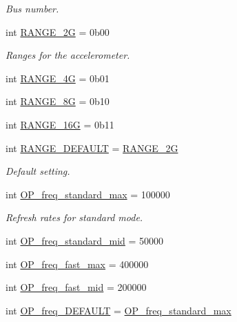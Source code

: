 \begin{DoxyCompactItemize}
\begin{DoxyCompactList}\small\item\em Bus number. \end{DoxyCompactList}\item 
int \mbox{\hyperlink{classlis3dh_1_1_l_i_s3_d_h_acb2659f4fa975b428d057cbdc2cc3994}{R\+A\+N\+G\+E\+\_\+2G}} = 0b00
\begin{DoxyCompactList}\small\item\em Ranges for the accelerometer. \end{DoxyCompactList}\item 
int \mbox{\hyperlink{classlis3dh_1_1_l_i_s3_d_h_a97209e265eb6f014b3bbd76f5effead4}{R\+A\+N\+G\+E\+\_\+4G}} = 0b01
\item 
int \mbox{\hyperlink{classlis3dh_1_1_l_i_s3_d_h_a8d7fe1d3e9ac748e51a60c88f6b9919c}{R\+A\+N\+G\+E\+\_\+8G}} = 0b10
\item 
int \mbox{\hyperlink{classlis3dh_1_1_l_i_s3_d_h_a6b8e3da0d38d864ad38d06a9bf413531}{R\+A\+N\+G\+E\+\_\+16G}} = 0b11
\item 
int \mbox{\hyperlink{classlis3dh_1_1_l_i_s3_d_h_a022306eeafee6751efac48439f7d1ef1}{R\+A\+N\+G\+E\+\_\+\+D\+E\+F\+A\+U\+LT}} = \mbox{\hyperlink{classlis3dh_1_1_l_i_s3_d_h_acb2659f4fa975b428d057cbdc2cc3994}{R\+A\+N\+G\+E\+\_\+2G}}
\begin{DoxyCompactList}\small\item\em Default setting. \end{DoxyCompactList}\item 
int \mbox{\hyperlink{classlis3dh_1_1_l_i_s3_d_h_a1668b09c1c200ebe8d79914121c116cf}{O\+P\+\_\+freq\+\_\+standard\+\_\+max}} = 100000
\begin{DoxyCompactList}\small\item\em Refresh rates for standard mode. \end{DoxyCompactList}\item 
int \mbox{\hyperlink{classlis3dh_1_1_l_i_s3_d_h_a900e965c0734d75e3fbe030ac464d7d5}{O\+P\+\_\+freq\+\_\+standard\+\_\+mid}} = 50000
\item 
int \mbox{\hyperlink{classlis3dh_1_1_l_i_s3_d_h_a405cf378022af5d2d177572c5c664aa1}{O\+P\+\_\+freq\+\_\+fast\+\_\+max}} = 400000
\item 
int \mbox{\hyperlink{classlis3dh_1_1_l_i_s3_d_h_a3df568d6e4080d25e53b0d8f62af477c}{O\+P\+\_\+freq\+\_\+fast\+\_\+mid}} = 200000
\item 
int \mbox{\hyperlink{classlis3dh_1_1_l_i_s3_d_h_ac3e1a74a98644f0d2c87f2d381b011e2}{O\+P\+\_\+freq\+\_\+\+D\+E\+F\+A\+U\+LT}} = \mbox{\hyperlink{classlis3dh_1_1_l_i_s3_d_h_a1668b09c1c200ebe8d79914121c116cf}{O\+P\+\_\+freq\+\_\+standard\+\_\+max}}

\end{DoxyCompactItemize}
